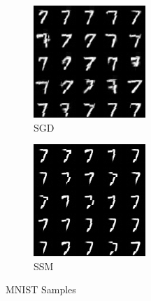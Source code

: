 \begin{figure}[H]
\begin{subfigure}[b]{0.3\textwidth}
        \includegraphics[width=\textwidth]{figures/mnist_SGD.png} %
        \caption{SGD}
        \label{fig:sub2}
    \end{subfigure}
    \hfill
    \begin{subfigure}[b]{0.3\textwidth}
        \centering
        \includegraphics[width=\textwidth]{figures/mnist_SSM.png} %
        \caption{SSM}
        \label{fig:sub3}
    \end{subfigure}

    \caption{MNIST Samples}
    \label{fig:three_images}
\end{figure}